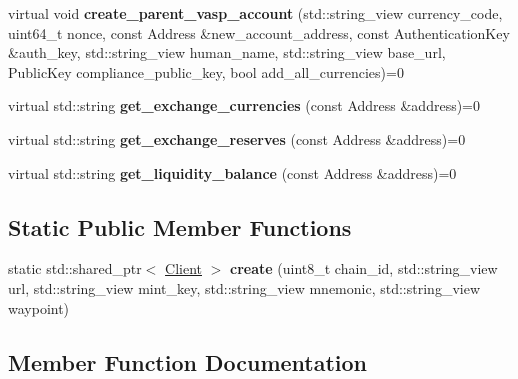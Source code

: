 \begin{DoxyCompactItemize}
\mbox{\label{classviolas_1_1_client_a93621de71b5e1a57adf52b477c896a33}} 
virtual void {\bfseries create\+\_\+parent\+\_\+vasp\+\_\+account} (std\+::string\+\_\+view currency\+\_\+code, uint64\+\_\+t nonce, const Address \&new\+\_\+account\+\_\+address, const Authentication\+Key \&auth\+\_\+key, std\+::string\+\_\+view human\+\_\+name, std\+::string\+\_\+view base\+\_\+url, Public\+Key compliance\+\_\+public\+\_\+key, bool add\+\_\+all\+\_\+currencies)=0
\item 
\mbox{\label{classviolas_1_1_client_a2a33749f60cff385eef861b8b275da20}} 
virtual std\+::string {\bfseries get\+\_\+exchange\+\_\+currencies} (const Address \&address)=0
\item 
\mbox{\label{classviolas_1_1_client_a4c9e93c5cbc079b7a7ce9827d62adb4e}} 
virtual std\+::string {\bfseries get\+\_\+exchange\+\_\+reserves} (const Address \&address)=0
\item 
\mbox{\label{classviolas_1_1_client_a2a76fde6b8e25e35a8f51419d4b4792d}} 
virtual std\+::string {\bfseries get\+\_\+liquidity\+\_\+balance} (const Address \&address)=0
\end{DoxyCompactItemize}
\subsection*{Static Public Member Functions}
\begin{DoxyCompactItemize}
\item 
\mbox{\label{classviolas_1_1_client_a5c99fa9be8d11bb28291e21d71e8dc8d}} 
static std\+::shared\+\_\+ptr$<$ \hyperlink{classviolas_1_1_client}{Client} $>$ {\bfseries create} (uint8\+\_\+t chain\+\_\+id, std\+::string\+\_\+view url, std\+::string\+\_\+view mint\+\_\+key, std\+::string\+\_\+view mnemonic, std\+::string\+\_\+view waypoint)
\end{DoxyCompactItemize}


\subsection{Member Function Documentation}
\mbox{\label{classviolas_1_1_client_aba697ca0b8ab6aba82934ff3f04c25f1}} 
